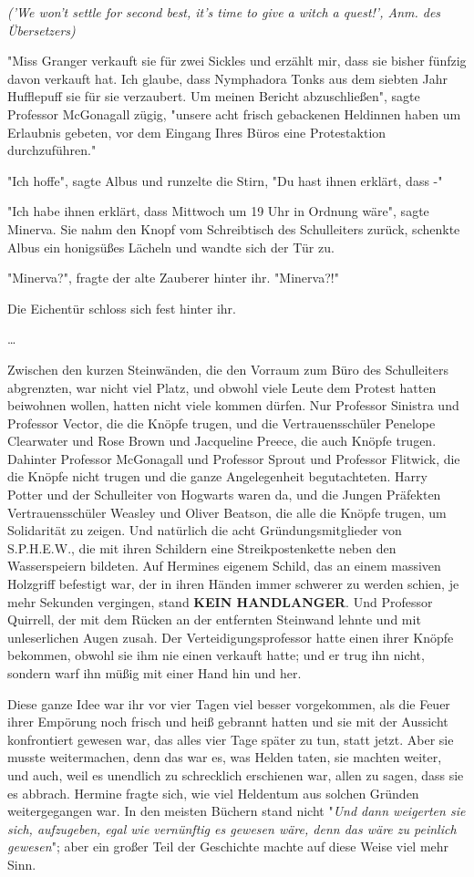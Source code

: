{\emph{('We won't settle for second best, it's time to give a witch a quest!', Anm. des Übersetzers)}

"Miss Granger verkauft sie für zwei Sickles und erzählt mir, dass sie bisher fünfzig davon verkauft hat. Ich glaube, dass Nymphadora Tonks aus dem siebten Jahr Hufflepuff sie für sie verzaubert. Um meinen Bericht abzuschließen", sagte Professor McGonagall zügig, "unsere acht frisch gebackenen Heldinnen haben um Erlaubnis gebeten, vor dem Eingang Ihres Büros eine Protestaktion durchzuführen."

"Ich hoffe", sagte Albus und runzelte die Stirn, "Du hast ihnen erklärt, dass -"

"Ich habe ihnen erklärt, dass Mittwoch um 19 Uhr in Ordnung wäre", sagte Minerva. Sie nahm den Knopf vom Schreibtisch des Schulleiters zurück, schenkte Albus ein honigsüßes Lächeln und wandte sich der Tür zu.

"Minerva?", fragte der alte Zauberer hinter ihr. "Minerva?!"

Die Eichentür schloss sich fest hinter ihr.

…

Zwischen den kurzen Steinwänden, die den Vorraum zum Büro des Schulleiters abgrenzten, war nicht viel Platz, und obwohl viele Leute dem Protest hatten beiwohnen wollen, hatten nicht viele kommen dürfen. Nur Professor Sinistra und Professor Vector, die die Knöpfe trugen, und die Vertrauensschüler Penelope Clearwater und Rose Brown und Jacqueline Preece, die auch Knöpfe trugen. Dahinter Professor McGonagall und Professor Sprout und Professor Flitwick, die die Knöpfe nicht trugen und die ganze Angelegenheit begutachteten. Harry Potter und der Schulleiter von Hogwarts waren da, und die Jungen Präfekten Vertrauensschüler Weasley und Oliver Beatson, die alle die Knöpfe trugen, um Solidarität zu zeigen. Und natürlich die acht Gründungsmitglieder von S.P.H.E.W., die mit ihren Schildern eine Streikpostenkette neben den Wasserspeiern bildeten. Auf Hermines eigenem Schild, das an einem massiven Holzgriff befestigt war, der in ihren Händen immer schwerer zu werden schien, je mehr Sekunden vergingen, stand \textbf{KEIN HANDLANGER}. Und Professor Quirrell, der mit dem Rücken an der entfernten Steinwand lehnte und mit unleserlichen Augen zusah. Der Verteidigungsprofessor hatte einen ihrer Knöpfe bekommen, obwohl sie ihm nie einen verkauft hatte; und er trug ihn nicht, sondern warf ihn müßig mit einer Hand hin und her.

Diese ganze Idee war ihr vor vier Tagen viel besser vorgekommen, als die Feuer ihrer Empörung noch frisch und heiß gebrannt hatten und sie mit der Aussicht konfrontiert gewesen war, das alles vier Tage später zu tun, statt jetzt. Aber sie musste weitermachen, denn das war es, was Helden taten, sie machten weiter, und auch, weil es unendlich zu schrecklich erschienen war, allen zu sagen, dass sie es abbrach. Hermine fragte sich, wie viel Heldentum aus solchen Gründen weitergegangen war. In den meisten Büchern stand nicht "\emph{Und dann weigerten sie sich, aufzugeben, egal wie vernünftig es gewesen wäre, denn das wäre zu peinlich gewesen}"; aber ein großer Teil der Geschichte machte auf diese Weise viel mehr Sinn.

}
